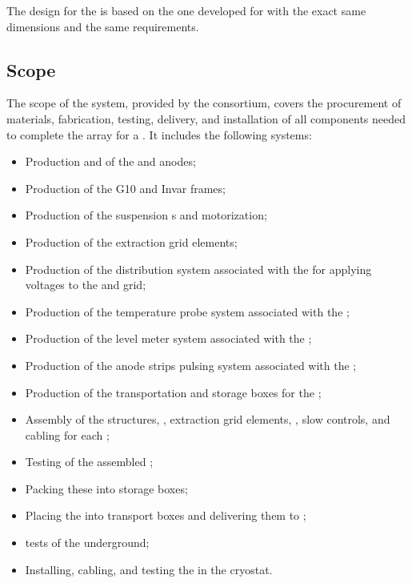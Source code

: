 The  design for the  is based on the one developed for  with the exact same dimensions and 
the same requirements.
\subsection{Scope}
\label{ch:dp-crp-scope}

The scope of the  system, provided by the  consortium, covers the procurement of materials, fabrication, testing, delivery, and installation of all components needed to complete the  array for a  . It includes the following systems: 
\begin{itemize}
\item  Production and  of the  and anodes;
\item  Production of the G10 and Invar frames;
\item Production of the suspension \fdth{}s and motorization;
\item Production of the extraction grid elements;
\item Production of the  distribution system associated with the  for applying voltages to the  and grid;
\item Production of the temperature probe system associated with the ;
\item Production of the level meter system associated with the ;
\item Production of the anode strips pulsing system  %
associated with the ;
\item Production of the transportation and storage boxes for the ;
\item Assembly of the  structures, , extraction grid elements, , slow controls, and cabling for each ;
\item Testing of the assembled ;
\item Packing these  into storage boxes;
\item Placing the  into transport boxes and delivering them to ; %
\item \coldbox tests of the  underground;
\item Installing, cabling, and testing the  in the cryostat.
\end{itemize}

